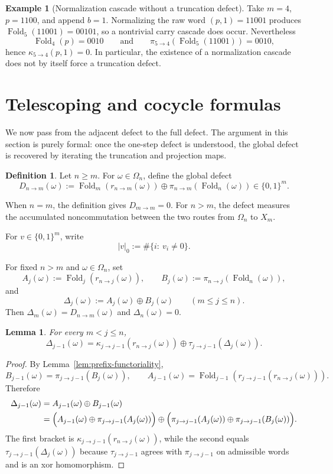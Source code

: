 \documentclass[11pt,reqno]{amsart}
\numberwithin{equation}{section}
\theoremstyle{plain}
\newtheorem{lemma}[theorem]{Lemma}
\theoremstyle{definition}
\newtheorem{definition}[theorem]{Definition}
\newtheorem{example}[theorem]{Example}
\theoremstyle{remark}
\DeclareMathOperator{\Fold}{Fold}
\begin{document}
\begin{example}[Normalization cascade without a truncation defect]
\label{ex:cascade-without-defect}
Take $m=4$, $p=1100$, and append $b=1$.  Normalizing the raw word $(p,1)=11001$
produces $\Fold_5(11001)=00101$, so a nontrivial carry cascade does occur.
Nevertheless
\[
\Fold_4(p)=0010
\qquad\text{and}\qquad
\pi_{5\to 4}(\Fold_5(11001))=0010,
\]
hence $\kappa_{5\to 4}(p,1)=0$.  In particular, the existence of a
normalization cascade does not by itself force a truncation defect.
\end{example}

\section{Telescoping and cocycle formulas}
\label{sec:telescoping}

We now pass from the adjacent defect to the full defect.  The argument in this
section is purely formal: once the one-step defect is understood, the global
defect is recovered by iterating the truncation and projection maps.

\begin{definition}
\label{def:global-defect}
Let $n\ge m$.  For $\omega\in\Omega_n$, define the global defect
\[
D_{n\to m}(\omega)
:=
\Fold_m(r_{n\to m}(\omega))
\oplus
\pi_{n\to m}(\Fold_n(\omega))
\in\{0,1\}^m.
\]
\end{definition}

When $n=m$, the definition gives $D_{m\to m}=0$.  For $n>m$, the defect
measures the accumulated noncommutation between the two routes from $\Omega_n$
to $X_m$.

For $v\in\{0,1\}^m$, write
\[
\lvert v\rvert_0:=\#\{i:\ v_i\ne 0\}.
\]

For fixed $n>m$ and $\omega\in\Omega_n$, set
\[
A_j(\omega):=\Fold_j(r_{n\to j}(\omega)),
\qquad
B_j(\omega):=\pi_{n\to j}(\Fold_n(\omega)),
\]
and
\[
\Delta_j(\omega):=A_j(\omega)\oplus B_j(\omega)
\qquad (m\le j\le n).
\]
Then $\Delta_m(\omega)=D_{n\to m}(\omega)$ and $\Delta_n(\omega)=0$.

\begin{lemma}
\label{lem:adjacent-recursion}
For every $m<j\le n$,
\[
\Delta_{j-1}(\omega)
=
\kappa_{j\to j-1}(r_{n\to j}(\omega))
\oplus
\tau_{j\to j-1}(\Delta_j(\omega)).
\]
\end{lemma}

\begin{proof}
By Lemma~\ref{lem:prefix-functoriality},
\[
B_{j-1}(\omega)=\pi_{j\to j-1}(B_j(\omega)),
\qquad
A_{j-1}(\omega)=\Fold_{j-1}(r_{j\to j-1}(r_{n\to j}(\omega))).
\]
Therefore
\[
\begin{aligned}
\Delta_{j-1}(\omega)
&=A_{j-1}(\omega)\oplus B_{j-1}(\omega) \\
&=
\Bigl(A_{j-1}(\omega)\oplus \pi_{j\to j-1}(A_j(\omega))\Bigr)
\oplus
\Bigl(\pi_{j\to j-1}(A_j(\omega))\oplus \pi_{j\to j-1}(B_j(\omega))\Bigr).
\end{aligned}
\]
The first bracket is $\kappa_{j\to j-1}(r_{n\to j}(\omega))$, while the second
equals $\tau_{j\to j-1}(\Delta_j(\omega))$ because $\tau_{j\to j-1}$ agrees
with $\pi_{j\to j-1}$ on admissible words and is an xor homomorphism.
\end{proof}
\end{document}
